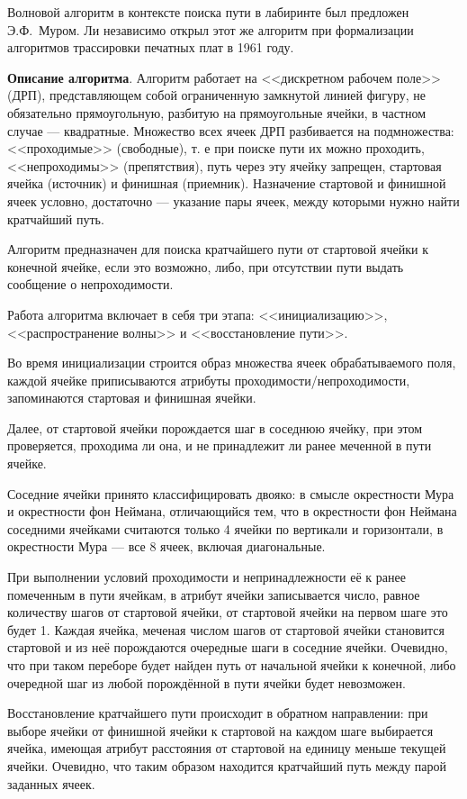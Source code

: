 Волновой алгоритм в контексте поиска пути в лабиринте был предложен Э.Ф.~Муром. 
Ли независимо открыл этот же алгоритм при формализации алгоритмов трассировки печатных плат в 1961 году.

\textbf{Описание алгоритма}.
Алгоритм работает на <<дискретном рабочем поле>> (ДРП), представляющем собой ограниченную замкнутой линией фигуру, не обязательно прямоугольную, разбитую на прямоугольные ячейки, в частном случае --- квадратные. 
Множество всех ячеек ДРП разбивается на подмножества: <<проходимые>> (свободные), т. е при поиске пути их можно проходить, <<непроходимы>> (препятствия), путь через эту ячейку запрещен, стартовая ячейка  (источник) и финишная (приемник). 
Назначение стартовой и финишной ячеек условно, достаточно --- указание пары ячеек, между которыми нужно найти кратчайший путь.

Алгоритм предназначен для поиска кратчайшего пути от стартовой ячейки к конечной ячейке, если это возможно, либо, при отсутствии пути выдать сообщение о непроходимости.

Работа алгоритма включает в себя три этапа: <<инициализацию>>, <<распространение волны>> и <<восстановление пути>>.

Во время инициализации строится образ множества ячеек обрабатываемого поля, каждой ячейке приписываются атрибуты проходимости/непроходимости, запоминаются стартовая и финишная ячейки.

Далее, от стартовой ячейки порождается шаг в соседнюю ячейку, при этом проверяется, проходима ли она, и не принадлежит ли ранее меченной в пути ячейке.

Соседние ячейки принято классифицировать двояко: в смысле окрестности Мура и окрестности фон Неймана, отличающийся тем, что в окрестности фон Неймана соседними ячейками считаются только 4 ячейки по вертикали и горизонтали, в окрестности Мура --- все 8 ячеек, включая диагональные.

При выполнении условий проходимости и непринадлежности её к ранее помеченным в пути ячейкам, в атрибут ячейки записывается число, равное количеству шагов от стартовой ячейки, от стартовой ячейки на первом шаге это будет 1. Каждая ячейка, меченая числом шагов от стартовой ячейки становится стартовой и из неё порождаются очередные шаги в соседние ячейки. 
Очевидно, что при таком переборе будет найден путь от начальной ячейки к конечной, либо очередной шаг из любой порождённой в пути ячейки будет невозможен.

Восстановление кратчайшего пути происходит в обратном направлении: при выборе ячейки от финишной ячейки к стартовой на каждом шаге выбирается ячейка, имеющая атрибут расстояния от стартовой на единицу меньше текущей ячейки. Очевидно, что таким образом находится кратчайший путь между парой заданных ячеек.

